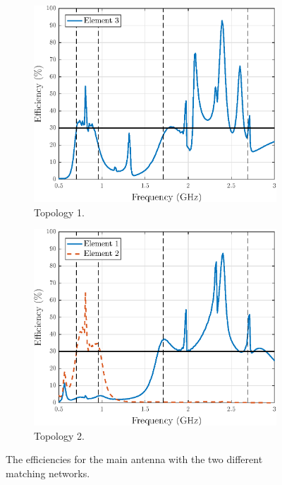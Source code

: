 \begin{figure}[H]
    \centering
    \begin{subfigure}[b]{0.49\textwidth}
        \includegraphics[width=\textwidth]{img/eff2_main.eps}
        \caption{Topology 1.}
        \label{fig:main_eff_top1}
    \end{subfigure}
    \begin{subfigure}[b]{0.49\textwidth}
        \includegraphics[width=\textwidth]{img/eff1_main.eps}
        \caption{Topology 2.}
        \label{fig:main_eff_top2}
    \end{subfigure}
    \caption{The efficiencies for the main antenna with the two different matching networks.}
    \label{fig:main_eff}
\end{figure}

